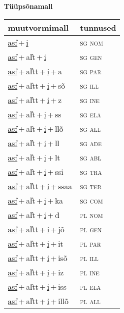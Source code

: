 
\vspace{1.8em}
\begin{minipage}{\textwidth}
\textbf{Tüüpsõnamall \,}\\

\begin{sideways}
\begin{tabular}{l l}
muutvormimall & tunnused \\
\hline
\underline{asf}\,+\,\underline{i} & \textsc{ sg nom } \\
\underline{asf}\,+\,al̕t\,+\,\underline{i} & \textsc{ sg gen } \\
\underline{asf}\,+\,al̕tt\,+\,\underline{i}\,+\,a & \textsc{ sg par } \\
\underline{asf}\,+\,al̕tt\,+\,\underline{i}\,+\,sõ & \textsc{ sg ill } \\
\underline{asf}\,+\,al̕tt\,+\,\underline{i}\,+\,z & \textsc{ sg ine } \\
\underline{asf}\,+\,al̕t\,+\,\underline{i}\,+\,ss & \textsc{ sg ela } \\
\underline{asf}\,+\,al̕t\,+\,\underline{i}\,+\,llõ & \textsc{ sg all } \\
\underline{asf}\,+\,al̕t\,+\,\underline{i}\,+\,ll & \textsc{ sg ade } \\
\underline{asf}\,+\,al̕t\,+\,\underline{i}\,+\,lt & \textsc{ sg abl } \\
\underline{asf}\,+\,al̕t\,+\,\underline{i}\,+\,ssi & \textsc{ sg tra } \\
\underline{asf}\,+\,al̕tt\,+\,\underline{i}\,+\,ssaa & \textsc{ sg ter } \\
\underline{asf}\,+\,al̕t\,+\,\underline{i}\,+\,ka & \textsc{ sg com } \\
\underline{asf}\,+\,al̕t\,+\,\underline{i}\,+\,d & \textsc{ pl nom } \\
\underline{asf}\,+\,al̕tt\,+\,\underline{i}\,+\,jõ & \textsc{ pl gen } \\
\underline{asf}\,+\,al̕tt\,+\,\underline{i}\,+\,it & \textsc{ pl par } \\
\underline{asf}\,+\,al̕tt\,+\,\underline{i}\,+\,isõ & \textsc{ pl ill } \\
\underline{asf}\,+\,al̕tt\,+\,\underline{i}\,+\,iz & \textsc{ pl ine } \\
\underline{asf}\,+\,al̕tt\,+\,\underline{i}\,+\,iss & \textsc{ pl ela } \\
\underline{asf}\,+\,al̕tt\,+\,\underline{i}\,+\,illõ & \textsc{ pl all } \\

\end{tabular}
\end{sideways}
\end{minipage}
